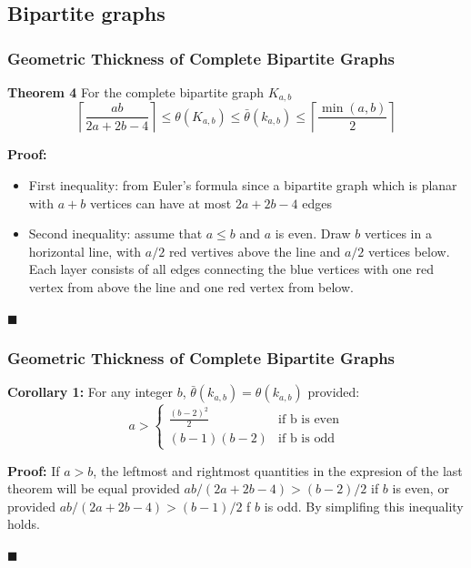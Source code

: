 \documentclass[12 pt]{beamer}
\begin{document}
    \subsection{Bipartite graphs}
    
\begin{frame}{}
    \frametitle{Geometric Thickness of Complete Bipartite Graphs}
    
    \begin{block}{\textbf{Theorem 4}}
    For the complete bipartite graph $K_{a, b}$
    $$\left \lceil \frac{ab}{2a + 2b - 4} \right \rceil \leq \theta (K_{a,b}) \leq \bar{\theta} (k_{a,b}) \leq \left \lceil \frac{\min(a, b)}{2}  \right \rceil$$
    \end{block}
    
    \pause
    
    \textbf{Proof:}
    \begin{itemize}
    \item First inequality: from Euler's formula since a bipartite graph which is planar with $a + b$ vertices can have at most $2a + 2b -4$ edges
    \item Second inequality: assume that $a \leq b$ and $a$ is even. Draw $b$ vertices in a horizontal line, with $a/2$ red vertives above the line and $a/2$ vertices below.
    Each layer consists of all edges connecting the blue vertices with one red vertex from above the line and one red vertex from below.
    \end{itemize}
    
    \begin{flushright}
    $\blacksquare$
    \end{flushright}
\end{frame}

\begin{frame}{}
    \frametitle{Geometric Thickness of Complete Bipartite Graphs}
    
    \begin{block}{\textbf{Corollary 1:}}
    For any integer $b$, $\bar{\theta} (k_{a,b}) = \theta (k_{a,b})$ provided:
    $$ a >
    \begin{cases}
    \frac{(b-2)^2}{2}  & \text{if b is even}\\
    (b-1)(b-2)  & \text{if b is odd}
    \end{cases}
    $$
    \end{block}
    
    \pause
    
    \textbf{Proof:}
    If $a > b$, the leftmost and rightmost quantities in the expresion of the last theorem will be equal provided $ab/(2a + 2b -4) > (b - 2)/2$ if $b$ is even, or provided  $ab/(2a + 2b -4) > (b - 1)/2$ f $b$ is odd. By simplifing this inequality holds.
    
    \begin{flushright}
    $\blacksquare$
    \end{flushright}
\end{frame}
\end{document}
